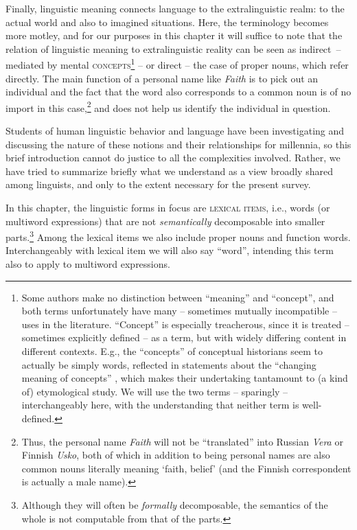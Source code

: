 \documentclass[output=paper]{langsci/langscibook}
\begin{document}
Finally, linguistic meaning connects language to the extralinguistic
realm: to the actual world and also to imagined situations. Here, the
terminology becomes more motley, and for our purposes in this chapter
it will suffice to note that the relation of linguistic meaning to
extralinguistic reality can be seen as indirect~-- mediated by mental
\textsc{concepts}\footnote{Some authors make no distinction between
  ``meaning'' and ``concept'', and both terms unfortunately have many
  -- sometimes mutually incompatible -- uses in the literature. ``Concept'' is
  especially treacherous, since it is treated -- sometimes explicitly
  defined -- as a term, but with widely differing content in different
  contexts. E.g., the ``concepts'' of conceptual historians seem to
  actually be simply words, reflected in statements about the
  ``changing meaning of concepts'' \citep{richter-1996}, which makes
  their undertaking tantamount to (a kind of) etymological study. We
  will use the two terms -- sparingly -- interchangeably here, with
  the understanding that neither term is well-defined.} -- or direct --
the case of proper nouns, which refer directly.  The main function of
a personal name like \emph{Faith} is to pick out an individual and the
fact that the word also corresponds to a common noun is of no import
in this case,\footnote{Thus, the personal name \emph{Faith} will not
  be ``translated'' into Russian \emph{Vera} or Finnish \emph{Usko},
  both of which in addition to being personal names are also common
  nouns literally meaning `faith, belief' (and the Finnish
  correspondent is actually a male name).} and does not help us
identify the individual in question.

Students of human linguistic behavior and language have been
investigating and discussing the nature of these notions and their
relationships for millennia, so this brief introduction cannot do
justice to all the complexities involved. Rather, we have tried to
summarize briefly what we understand as a view broadly shared among
linguists, and only to the extent necessary for the present survey.


In this chapter, the linguistic forms in focus are \textsc{lexical
  items}, i.e., words (or multiword expressions) that are not
\emph{semantically} decomposable into smaller parts.\footnote{Although they will often be \emph{formally} decomposable, the semantics of the whole is not computable from that of the parts.} Among the lexical items
we also include proper nouns and function words. Interchangeably with
lexical item we will also say ``word'', intending this term also
to apply to multiword expressions.
\end{document}
